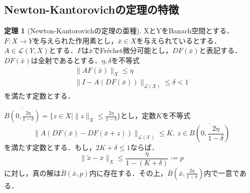 \documentclass[11pt,a4paper]{jsarticle}
\theoremstyle{definition}
\newtheorem{thm}{定理}
\begin{document}
\subsection{Newton-Kantorovichの定理の特徴\cite{}}
\begin{thm}[Newton-Kantorovichの定理の亜種]
  XとYをBanach空間とする．$F:X\rightarrow Y$を与えられた作用素とし，$\bar{x}\in X$を与えられているとする．$A\in \mathcal{L}(Y,X)$とする．$F$は$\bar{x}$でFr\'{e}chet微分可能とし，$DF(\bar{x})$と表記する．$DF(\bar{x})$は全射であるとする．$\eta,\delta$を不等式
  \begin{align*}
    \|AF(\bar{x})\|_X \leq \eta \\
    \|I-A(DF(\bar{x}))\|_{\mathcal{L}(X)} \leq \delta < 1
  \end{align*}
  を満たす定数とする．

  $\overline{B(0,\frac{2\eta}{1-\delta})} = \{z\in X \mid \|z\|_X \leq \frac{2\eta}{1-\delta} \}$とし，定数$K$を不等式
  \begin{equation*}
    \|A(DF(\bar{x})-DF(\bar{x}+z))\|_\mathcal{{L}(X)} \leq K,\ z\in \overline{B\left(0,\frac{2\eta}{1-\delta}\right)}
  \end{equation*}
  を満たす定数とする．もし，$2K+\delta\leq 1$ならば．
  \begin{equation*}
    \|\tilde{x}-\bar{x}\|_X \leq \frac{\eta}{1-(K+\delta)} := p
  \end{equation*}
  に対し，真の解は$\bar{B}(\bar{x},p)$内に存在する．その上，$\bar{B}\left(\bar{x},\frac{2\eta}{1-\delta}\right)$内で一意である．
\end{thm}
\end{document}
